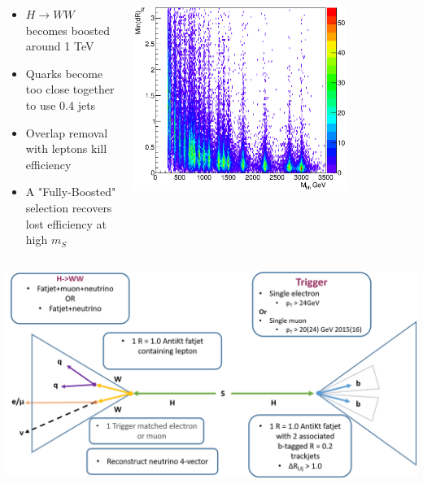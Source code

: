 \documentclass{beamer}
\newcommand*{\header}[1]{\fontsize{16}{8}\selectfont \textbf{{\color{MyPurple}{#1}}}}
\begin{document}
\begin{frame}
\begin{center}
\header{Motivation}
\end{center}
\vspace{-0.5cm}
\begin{columns}
\begin{column}{0.5\textwidth}
\begin{itemize}
\footnotesize
\item $H\rightarrow{}WW$ becomes boosted around 1 TeV 
\item Quarks become too close together to use 0.4 jets
\item Overlap removal with leptons kill efficiency
\item A "Fully-Boosted" selection recovers lost efficiency at high $m_S$
\end{itemize}
\end{column}
\begin{column}{0.5\textwidth}
\begin{center}
\includegraphics[width=0.75\textwidth]{figures/drminlq}
\end{center}
\end{column}
\end{columns}
\end{frame}

\begin{frame}
\begin{center}
\header{Fully Boosted Event Selection}
\end{center}
\begin{center}
\includegraphics[width=1\textwidth]{figures/fullboost}
\end{center}
\end{frame}
\end{document}
